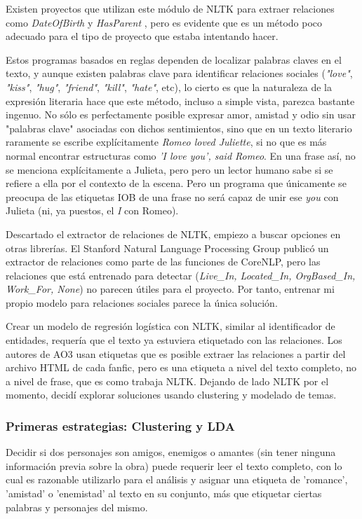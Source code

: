 \documentclass{pre-tfg}
\begin{document}
Existen proyectos que utilizan este módulo de NLTK para extraer relaciones como \textit{DateOfBirth} y \textit{HasParent} \cite{jose_2017}, pero es evidente que es un método poco adecuado para el tipo de proyecto que estaba intentando hacer.

Estos programas basados en reglas dependen de localizar palabras claves en el texto, y aunque existen palabras clave para identificar relaciones sociales (\textit{"love"}, \textit{"kiss"}, \textit{"hug"}, \textit{"friend"}, \textit{"kill"}, \textit{"hate"}, etc), lo cierto es que la naturaleza de la expresión literaria hace que este método, incluso a simple vista, parezca bastante ingenuo. No sólo es perfectamente posible expresar amor, amistad y odio sin usar "palabras clave" asociadas con dichos sentimientos, sino que en un texto literario raramente se escribe explícitamente \textit{Romeo loved Juliette}, si no que es más normal encontrar estructuras como \textit{'I love you', said Romeo}. En una frase así, no se menciona explícitamente a Julieta, pero pero un lector humano sabe si se refiere a ella por el contexto de la escena. Pero un programa que únicamente se preocupa de las etiquetas IOB de una frase no será capaz de unir ese \textit{you} con Julieta (ni, ya puestos, el \textit{I} con Romeo).

Descartado el extractor de relaciones de NLTK, empiezo a buscar opciones en otras librerías. El Stanford Natural Language Processing Group publicó un extractor de relaciones como parte de las funciones de CoreNLP, pero las relaciones que está entrenado para detectar (\textit{Live\_In, Located\_In, OrgBased\_In, Work\_For, None}) no parecen útiles para el proyecto. Por tanto, entrenar mi propio modelo para relaciones sociales parece la única solución.

Crear un modelo de regresión logística con NLTK, similar al identificador de entidades, requería que el texto ya estuviera etiquetado con las relaciones. Los autores de AO3 usan etiquetas que es posible extraer las relaciones a partir del archivo HTML de cada fanfic, pero es una etiqueta a nivel del texto completo, no a nivel de frase, que es como trabaja NLTK. Dejando de lado NLTK por el momento, decidí explorar soluciones usando clustering y modelado de temas.

\subsubsection{Primeras estrategias: Clustering y LDA}
\label{sec:relextract}
Decidir si dos personajes son amigos, enemigos o amantes (sin tener ninguna información previa sobre la obra) puede requerir leer el texto completo, con lo cual es razonable utilizarlo para el análisis y asignar una etiqueta de 'romance', 'amistad' o 'enemistad' al texto en su conjunto, más que etiquetar ciertas palabras y personajes del mismo.
\end{document}

